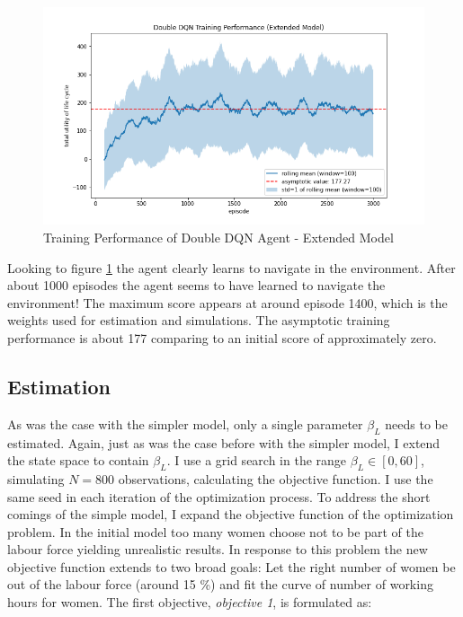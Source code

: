 \begin{figure}[ht]
    \centering
    \includegraphics[scale=0.4]{figures/ddqn_extended_model_training_performance.png}
    \caption{Training Performance of Double DQN Agent - Extended Model}
    \label{fig:training_extended}
\end{figure}

Looking to figure \ref{fig:training_extended} the agent clearly learns to navigate in the environment. After about 1000 episodes the agent seems to have learned to navigate the environment! The maximum score appears at around episode 1400, which is the weights used for estimation and simulations. The asymptotic training performance is about 177 comparing to an initial score of approximately zero.

\subsection{Estimation}

As was the case with the simpler model, only a single parameter $\beta_L$ needs to be estimated. Again, just as was the case before with the simpler model, I extend the state space to contain $\beta_L$. I use a grid search in the range $\beta_L \in [0, 60]$, simulating $N=800$ observations, calculating the objective function. I use the same seed in each iteration of the optimization process. To address the short comings of the simple model, I expand the objective function of the optimization problem. In the initial model too many women choose not to be part of the labour force yielding unrealistic results. In response to this problem the new objective function extends to two broad goals: Let the right number of women be out of the labour force (around 15 \%) and fit the curve of number of working hours for women. The first objective, \textit{objective 1}, is formulated as: 

